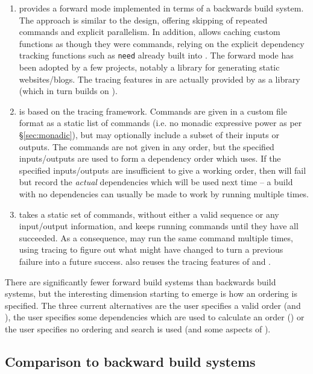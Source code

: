 \begin{enumerate}
\item \Shake \cite{shake} provides a forward mode implemented in terms of a backwards build system. The approach is similar to the \Fabricate design, offering skipping of repeated commands and explicit parallelism. In addition, \Shake allows caching custom functions as though they were commands, relying on the explicit dependency tracking functions such as \texttt{need} already built into \Shake. The forward mode has been adopted by a few projects, notably a library for generating static websites/blogs. The tracing features in \Rattle are actually provided by \Shake as a library (which in turn builds on \Fsatrace).
\item \Fac \cite{fac} is based on the \Bigbro tracing framework. Commands are given in a custom file format as a static list of commands (i.e. no monadic expressive power as per \S\ref{sec:monadic}), but may optionally include a subset of their inputs or outputs. The commands are not given in any order, but the specified inputs/outputs are used to form a dependency order which \Fac uses. If the specified inputs/outputs are insufficient to give a working order, then \Fac will fail but record the \emph{actual} dependencies which will be used next time -- a build with no dependencies can usually be made to work by running \Fac multiple times.
\item \Stroll \cite{stroll} takes a static set of commands, without either a valid sequence or any input/output information, and keeps running commands until they have all succeeded. As a consequence, \Stroll may run the same command multiple times, using tracing to figure out what might have changed to turn a previous failure into a future success. \Stroll also reuses the tracing features of \Shake and \Fsatrace.
\end{enumerate}

There are significantly fewer forward build systems than backwards build systems, but the interesting dimension starting to emerge is how an ordering is specified. The three current alternatives are the user specifies a valid order (\Fabricate and \Rattle), the user specifies some dependencies which are used to calculate an order (\Fac) or the user specifies no ordering and search is used (\Stroll and some aspects of \Fac).

\subsection{Comparison to backward build systems}

